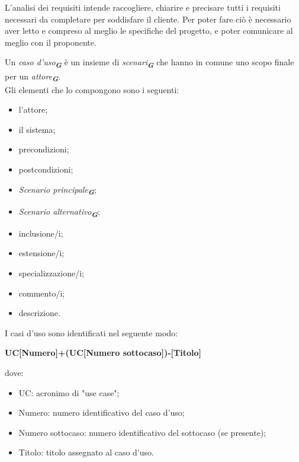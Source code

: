 L’analisi dei requisiti intende raccogliere, chiarire e precisare tutti i requisiti necessari da completare per soddisfare il cliente. Per poter fare ciò è necessario aver letto e compreso al meglio le specifiche del progetto, e poter comunicare al meglio con il proponente.

Un \emph{caso d'uso}\textsubscript{\textit{\textbf{G}}} è un insieme di \emph{scenari}\textsubscript{\textit{\textbf{G}}} che hanno in comune uno scopo finale per un \emph{attore}\textsubscript{\textit{\textbf{G}}}.\\
Gli elementi che lo compongono sono i seguenti:
\begin{itemize}
    \item l'attore;
    \item il sistema;
    \item precondizioni;
    \item postcondizioni;
    \item \emph{Scenario principale}\textsubscript{\textit{\textbf{G}}};
    \item \emph{Scenario alternativo}\textsubscript{\textit{\textbf{G}}};
    \item inclusione/i;
    \item estensione/i;
    \item specializzazione/i;
    \item commento/i;
    \item descrizione.  
\end{itemize}
I casi d’uso sono identificati nel seguente modo:\\
\begin{center}
    \textbf{UC[Numero]+(UC[Numero sottocaso])-[Titolo]}
\end{center}
dove:
\begin{itemize}
    \item UC: acronimo di "use case";
    \item Numero: numero identificativo del caso d’uso;
    \item Numero sottocaso: numero identificativo del sottocaso (se presente);
    \item Titolo: titolo assegnato al caso d’uso.
\end{itemize}

